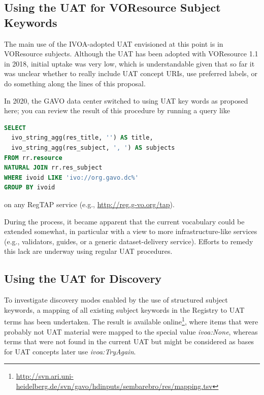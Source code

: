 \documentclass[11pt,a4paper]{ivoa}
\begin{document}
\subsection{Using the UAT for VOResource Subject Keywords}

The main use of the IVOA-adopted UAT envisioned at this point is in
VOResource subjects.  Although the UAT has been adopted with VOResource
1.1 in 2018, initial uptake was very low, which is
understandable given that so far it was unclear whether to really include UAT
concept URIs, use preferred labels, or do something along the
lines of this proposal.

In 2020, the GAVO data center switched to using UAT key words as
proposed here; you can review the result of this procedure by running
a query like

\begin{minipage}{12cm}
\begin{lstlisting}[language=SQL]
SELECT 
  ivo_string_agg(res_title, '') AS title,
  ivo_string_agg(res_subject, ', ') AS subjects
FROM rr.resource
NATURAL JOIN rr.res_subject
WHERE ivoid LIKE 'ivo://org.gavo.dc%'
GROUP BY ivoid
\end{lstlisting}
\end{minipage}

\noindent on any RegTAP service (e.g., \url{http://reg.g-vo.org/tap}).

During the process, it became apparent that the current vocabulary could
be extended somewhat, in particular with a view to more
infrastructure-like services (e.g., validators, guides, or a generic
dataset-delivery service).  Efforts to remedy this lack are underway
using regular UAT procedures.



\subsection{Using the UAT for Discovery}

To investigate discovery modes enabled by the use of structured subject
keywords, a mapping of all existing subject keywords in the Registry to
UAT terms has been undertaken.  The result is available
online\footnote{\url{http://svn.ari.uni-heidelberg.de/svn/gavo/hdinputs/sembarebro/res/mapping.tsv}},
where items that were probably not UAT material were mapped to the
special value \emph{ivoa:None}, whereas terms that were not found in the
current UAT but might be considered as bases for UAT concepts later use
\emph{ivoa:TryAgain}.
\end{document}
